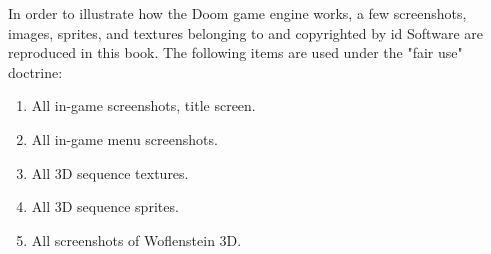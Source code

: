 In order to illustrate how the Doom game engine works, a few screenshots, images, sprites, and textures belonging to and copyrighted by id Software are reproduced in this book. The following items are used under the "fair use" doctrine:\\
\par
\begin{enumerate}
	\item All in-game screenshots, title screen.
	\item All in-game menu screenshots.
	\item All 3D sequence textures.
    \item All 3D sequence sprites.
    \item All screenshots of Woflenstein 3D.
\end{enumerate}
